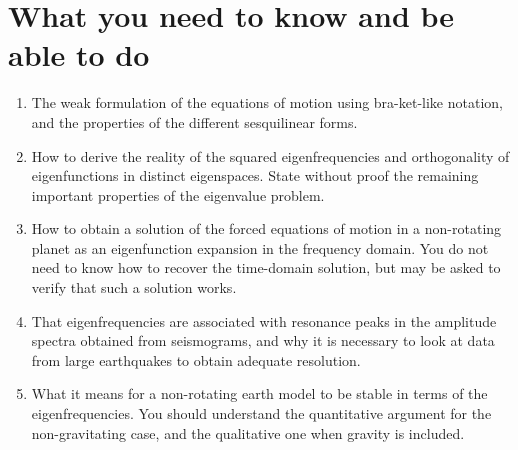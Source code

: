 \section*{What you need to know and be able to do}
\begin{enumerate}
    \item[(i)] The weak formulation of the equations of motion using bra-ket-like notation, and the properties of the different sesquilinear forms.
    \item[(ii)] How to derive the reality of the squared eigenfrequencies and orthogonality of eigenfunctions in distinct eigenspaces. State without proof the remaining important properties of the eigenvalue problem.
    \item[(iii)] How to obtain a solution of the forced equations of motion in a non-rotating planet as an eigenfunction expansion in the frequency domain. You do not need to know how to recover the time-domain solution, but may be asked to verify that such a solution works.
    \item[(iv)] That eigenfrequencies are associated with resonance peaks in the amplitude spectra obtained from seismograms, and why it is necessary to look at data from large earthquakes to obtain adequate resolution.
    \item[(v)] What it means for a non-rotating earth model to be stable in terms of the eigenfrequencies. You should understand the quantitative argument for the non-gravitating case, and the qualitative one when gravity is included.
\end{enumerate}

